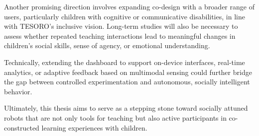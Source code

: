 \documentclass[a4paper]{usiinfbachelorproject}
\begin{document}
Another promising direction involves expanding co-design with a broader range of users, particularly children with cognitive or communicative disabilities, in line with TESORO's inclusive vision.
Long-term studies will also be necessary to assess whether repeated teaching interactions lead to meaningful changes in children's social skills, sense of agency, or emotional understanding.

Technically, extending the dashboard to support on-device interfaces, real-time analytics, or adaptive feedback based on multimodal sensing could further bridge the gap between controlled experimentation and autonomous, socially intelligent behavior.

Ultimately, this thesis aims to serve as a stepping stone toward socially attuned robots that are not only tools for teaching but also active participants in co-constructed learning experiences with children.

\newpage



\end{document}
